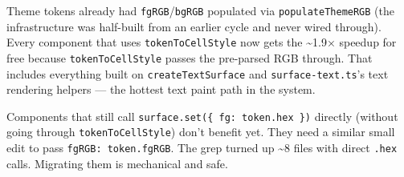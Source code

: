 Theme tokens already had \texttt{f\allowbreak{}g\allowbreak{}R\allowbreak{}G\allowbreak{}B}/\texttt{b\allowbreak{}g\allowbreak{}R\allowbreak{}G\allowbreak{}B} populated via \texttt{p\allowbreak{}o\allowbreak{}p\allowbreak{}u\allowbreak{}l\allowbreak{}a\allowbreak{}t\allowbreak{}e\allowbreak{}T\allowbreak{}h\allowbreak{}e\allowbreak{}m\allowbreak{}e\allowbreak{}R\allowbreak{}G\allowbreak{}B} (the infrastructure was half-built from an earlier cycle and never wired through). Every component that uses \texttt{t\allowbreak{}o\allowbreak{}k\allowbreak{}e\allowbreak{}n\allowbreak{}T\allowbreak{}o\allowbreak{}C\allowbreak{}e\allowbreak{}l\allowbreak{}l\allowbreak{}S\allowbreak{}t\allowbreak{}y\allowbreak{}l\allowbreak{}e} now gets the \textasciitilde1.9× speedup for free because \texttt{t\allowbreak{}o\allowbreak{}k\allowbreak{}e\allowbreak{}n\allowbreak{}T\allowbreak{}o\allowbreak{}C\allowbreak{}e\allowbreak{}l\allowbreak{}l\allowbreak{}S\allowbreak{}t\allowbreak{}y\allowbreak{}l\allowbreak{}e} passes the pre-parsed RGB through. That includes everything built on \texttt{c\allowbreak{}r\allowbreak{}e\allowbreak{}a\allowbreak{}t\allowbreak{}e\allowbreak{}T\allowbreak{}e\allowbreak{}x\allowbreak{}t\allowbreak{}S\allowbreak{}u\allowbreak{}r\allowbreak{}f\allowbreak{}a\allowbreak{}c\allowbreak{}e} and \texttt{s\allowbreak{}u\allowbreak{}r\allowbreak{}f\allowbreak{}a\allowbreak{}c\allowbreak{}e\allowbreak{}-\allowbreak{}t\allowbreak{}e\allowbreak{}x\allowbreak{}t\allowbreak{}.\allowbreak{}t\allowbreak{}s}'s text rendering helpers --- the hottest text paint path in the system.

Components that still call \texttt{s\allowbreak{}u\allowbreak{}r\allowbreak{}f\allowbreak{}a\allowbreak{}c\allowbreak{}e\allowbreak{}.\allowbreak{}s\allowbreak{}e\allowbreak{}t\allowbreak{}(\allowbreak{}\{\allowbreak{} \allowbreak{}f\allowbreak{}g\allowbreak{}:\allowbreak{} \allowbreak{}t\allowbreak{}o\allowbreak{}k\allowbreak{}e\allowbreak{}n\allowbreak{}.\allowbreak{}h\allowbreak{}e\allowbreak{}x\allowbreak{} \allowbreak{}\}\allowbreak{})} directly (without going through \texttt{t\allowbreak{}o\allowbreak{}k\allowbreak{}e\allowbreak{}n\allowbreak{}T\allowbreak{}o\allowbreak{}C\allowbreak{}e\allowbreak{}l\allowbreak{}l\allowbreak{}S\allowbreak{}t\allowbreak{}y\allowbreak{}l\allowbreak{}e}) don't benefit yet. They need a similar small edit to pass \texttt{f\allowbreak{}g\allowbreak{}R\allowbreak{}G\allowbreak{}B\allowbreak{}:\allowbreak{} \allowbreak{}t\allowbreak{}o\allowbreak{}k\allowbreak{}e\allowbreak{}n\allowbreak{}.\allowbreak{}f\allowbreak{}g\allowbreak{}R\allowbreak{}G\allowbreak{}B}. The grep turned up \textasciitilde8 files with direct \texttt{.\allowbreak{}h\allowbreak{}e\allowbreak{}x} calls. Migrating them is mechanical and safe.

